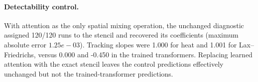 \paragraph{Detectability control.} With attention as the only spatial mixing operation, the unchanged diagnostic assigned 120/120 runs to the stencil and recovered its coefficients (maximum absolute error $ 1.25e-03 $). Tracking slopes were 1.000 for heat and 1.001 for Lax--Friedrichs, versus 0.000 and -0.450 in the trained transformers. Replacing learned attention with the exact stencil leaves the control predictions effectively unchanged but not the trained-transformer predictions.
